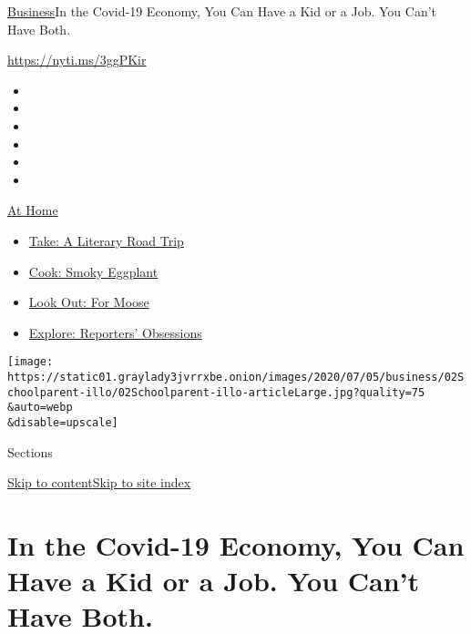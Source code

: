 \href{/section/business}{Business}\textbar{}In the Covid-19 Economy, You
Can Have a Kid or a Job. You Can't Have Both.

\url{https://nyti.ms/3ggPKir}

\begin{itemize}
\item
\item
\item
\item
\item
\item
\end{itemize}

\href{https://www.nytimes3xbfgragh.onion/spotlight/at-home?action=click\&pgtype=Article\&state=default\&region=TOP_BANNER\&context=at_home_menu}{At
Home}

\begin{itemize}
\tightlist
\item
  \href{https://www.nytimes3xbfgragh.onion/2020/07/28/books/time-for-a-literary-road-trip.html?action=click\&pgtype=Article\&state=default\&region=TOP_BANNER\&context=at_home_menu}{Take:
  A Literary Road Trip}
\item
  \href{https://www.nytimes3xbfgragh.onion/2020/07/29/magazine/bored-with-your-home-cooking-some-smoky-eggplant-will-fix-that.html?action=click\&pgtype=Article\&state=default\&region=TOP_BANNER\&context=at_home_menu}{Cook:
  Smoky Eggplant}
\item
  \href{https://www.nytimes3xbfgragh.onion/2020/07/27/travel/moose-michigan-isle-royale.html?action=click\&pgtype=Article\&state=default\&region=TOP_BANNER\&context=at_home_menu}{Look
  Out: For Moose}
\item
  \href{https://www.nytimes3xbfgragh.onion/interactive/2020/at-home/even-more-reporters-editors-diaries-lists-recommendations.html?action=click\&pgtype=Article\&state=default\&region=TOP_BANNER\&context=at_home_menu}{Explore:
  Reporters' Obsessions}
\end{itemize}

\texttt{[image: https://static01.graylady3jvrrxbe.onion/images/2020/07/05/business/02Schoolparent-illo/02Schoolparent-illo-articleLarge.jpg?quality=75\\\&auto=webp\\\&disable=upscale]}

Sections

\protect\hyperlink{site-content}{Skip to
content}\protect\hyperlink{site-index}{Skip to site index}

\hypertarget{in-the-covid-19-economy-you-can-have-a-kid-or-a-job-you-cant-have-both}{%
\section{In the Covid-19 Economy, You Can Have a Kid or a Job. You Can't
Have
Both.}\label{in-the-covid-19-economy-you-can-have-a-kid-or-a-job-you-cant-have-both}}

